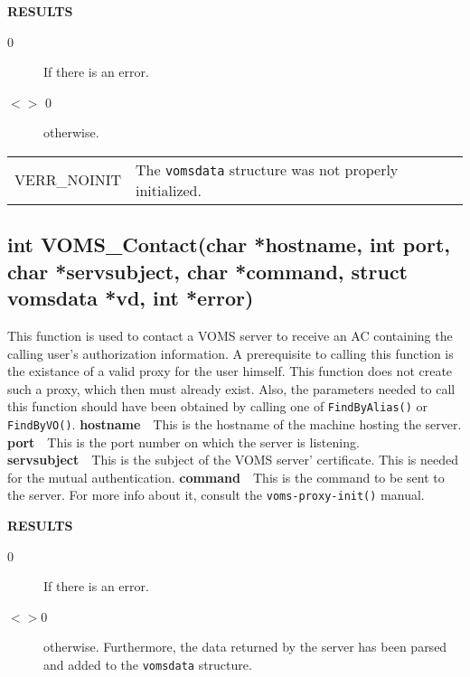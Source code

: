 \documentclass[a4paper]{book}
\newcommand{\result}{\noindent \textbf{RESULTS}\newline}
\newcommand{\parameter}[1]{\newline\textbf{#1}\ \ }
\begin{document}
\result
\begin{description}
\item[0] If there is an error.
\item[$<>$ 0] otherwise.
\end{description}

\bigskip\begin{tabular}{lp{3in}}
VERR\_NOINIT & The \verb|vomsdata| structure was not properly
initialized.\\
\end{tabular}


\subsection{int VOMS\_Contact(char *hostname, int port, char
  *servsubject, char *command, struct vomsdata *vd, int *error)}

This function is used to contact a VOMS server to receive an AC
containing the calling user's authorization information.  A
prerequisite to calling this function is the existance of a valid
proxy for the user himself.  This function does not create such a
proxy, which then must already exist.  Also, the parameters needed to
call this function should have been obtained by calling one of
\verb|FindByAlias()| or \verb|FindByVO()|.
\parameter{hostname}{This is the hostname of the machine hosting the
  server.}
\parameter{port}{This is the port number on which the server is
  listening.}
\parameter{servsubject}{This is the subject of the VOMS server'
  certificate.  This is needed for the mutual authentication.}
\parameter{command}{This is the command to be sent to the server.  For
  more info about it, consult the \verb|voms-proxy-init()| manual.}

\result
\begin{description}
\item[0] If there is an error.
\item[$<>$0] otherwise.  Furthermore, the data returned by the server
  has been parsed and added to the \verb|vomsdata| structure.
\end{description}
\end{document}
